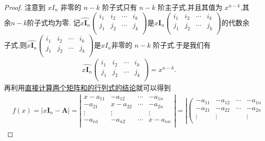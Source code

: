 \documentclass[lang=cn,newtx,10pt,scheme=chinese]{elegantbook}
\begin{document}
\begin{proof}
    注意到 \(xI_{n}\) 非零的 \(n - k\) 阶子式只有 \(n - k\) 阶主子式,并且其值为 \(x^{n - k}\),其余$n-k$阶子式均为零.
    记$\widehat{x\boldsymbol{I}_n}\left( \begin{matrix}
        i_1&		i_2&		\cdots&		i_k\\
        j_1&		j_2&		\cdots&		j_k\\
    \end{matrix} \right)$是$x\boldsymbol{I}_n\left( \begin{matrix}
        i_1&		i_2&		\cdots&		i_k\\
        j_1&		j_2&		\cdots&		j_k\\
    \end{matrix} \right)$的代数余子式,则$\widehat{x\boldsymbol{I}_n}\left( \begin{matrix}
        i_1&		i_2&		\cdots&		i_k\\
        j_1&		j_2&		\cdots&		j_k\\
    \end{matrix} \right)$是\(xI_{n}\)非零的 \(n - k\) 阶子式.于是我们有
    \begin{align*}
        \widehat{x\boldsymbol{I}_n}\left( \begin{matrix}
        i_1&		i_2&		\cdots&		i_k\\
        j_1&		j_2&		\cdots&		j_k\\
    \end{matrix} \right) =x^{n-k}.
    \end{align*}
    再利用\hyperref[proposition:直接计算两个矩阵和的行列式]{直接计算两个矩阵和的行列式的结论}就可以得到
    \begin{align*}
        &f(x)=|x\boldsymbol{I}_n-\boldsymbol{A}|=\left| \begin{matrix}
            x-a_{11}&		-a_{12}&		\cdots&		-a_{1n}\\
            -a_{21}&		x-a_{22}&		\cdots&		-a_{2n}\\
            \vdots&		\vdots&		&		\vdots\\
            -a_{n1}&		-a_{n2}&		\cdots&		x-a_{nn}\\
        \end{matrix} \right|=\left| \left( \begin{matrix}
            -a_{11}&		-a_{12}&		\cdots&		-a_{1n}\\
            -a_{21}&		-a_{22}&		\cdots&		-a_{2n}\\
            \vdots&		\vdots&		&		\vdots\\

\end{matrix}
\end{align*}
\end{proof}
\end{document}
